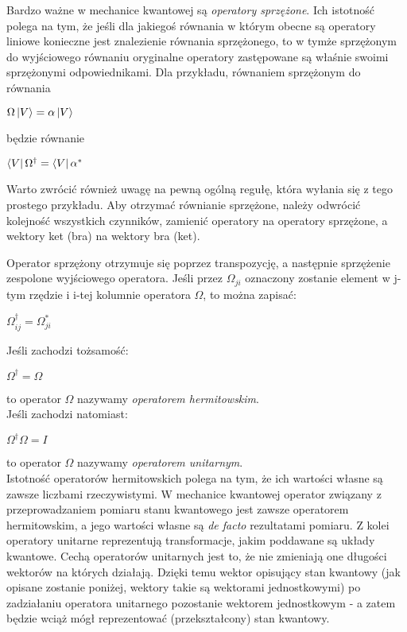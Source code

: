 \documentclass[12pt,a4paper,twoside,openany]{book}
\begin{document}
Bardzo ważne w mechanice kwantowej są \textit{operatory sprzężone}. Ich istotność polega na tym, że jeśli dla jakiegoś równania w którym obecne są operatory liniowe konieczne jest znalezienie równania sprzężonego, to w tymże sprzężonym do wyjściowego równaniu oryginalne operatory zastępowane są właśnie swoimi sprzężonymi odpowiednikami. Dla przykładu, równaniem sprzężonym do równania
\begin{center}
    $\Omega\ket{V} = \alpha\ket{V}$
\end{center}
będzie równanie
\begin{center}
    $\bra{V}\Omega^\dagger = \bra{V}\alpha^*$
\end{center}
Warto zwrócić również uwagę na pewną ogólną regułę, która wyłania się z tego prostego przykładu. Aby otrzymać równianie sprzężone, należy odwrócić kolejność wszystkich czynników, zamienić operatory na operatory sprzężone, a wektory ket (bra) na wektory bra (ket).

Operator sprzężony otrzymuje się poprzez transpozycję, a następnie sprzężenie zespolone wyjściowego operatora. Jeśli przez $\Omega_{ji}$ oznaczony zostanie element w j-tym rzędzie i i-tej kolumnie operatora $\Omega$, to można zapisać:
\begin{center}
    $\Omega^\dagger_{ij} = \Omega^*_{ji}$
\end{center}

Jeśli zachodzi tożsamość:
\begin{center}
    $\Omega^\dagger = \Omega$
\end{center}
to operator $\Omega$ nazywamy \textit{operatorem hermitowskim}.
~\\
Jeśli zachodzi natomiast:
\begin{center}
    $\Omega^\dagger\Omega = \textit{I}$
\end{center}
to operator $\Omega$ nazywamy \textit{operatorem unitarnym}.
~\\

Istotność operatorów hermitowskich polega na tym, że ich wartości własne są zawsze liczbami rzeczywistymi. W mechanice kwantowej operator związany z przeprowadzaniem pomiaru stanu kwantowego jest zawsze operatorem hermitowskim, a jego wartości własne są \textit{de facto} rezultatami pomiaru.
Z kolei operatory unitarne reprezentują transformacje, jakim poddawane są układy kwantowe. Cechą operatorów unitarnych jest to, że nie zmieniają one długości wektorów na których działają. Dzięki temu wektor opisujący stan kwantowy (jak opisane zostanie poniżej, wektory takie są wektorami jednostkowymi) po zadziałaniu operatora unitarnego pozostanie wektorem jednostkowym - a zatem będzie wciąż mógł reprezentować (przekształcony) stan kwantowy.
\end{document}
